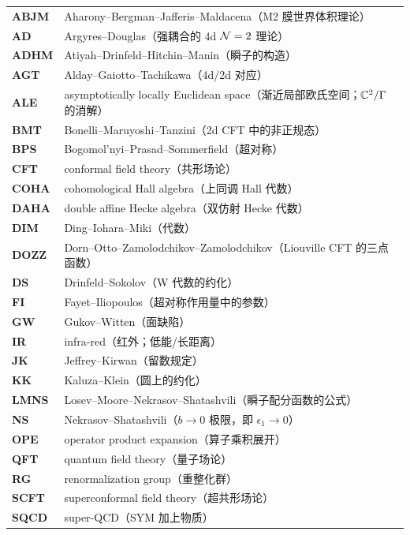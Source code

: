 {\small
\begin{longtable}{@{}l@{\hspace{1.2em}}p{13.1cm}@{}}
\textbf{ABJM} & Aharony--Bergman--Jafferis--Maldacena（M2 膜世界体积理论）\\
\textbf{AD} & Argyres--Douglas（强耦合的 4d $\mathcal{N}=2$ 理论）\\
\textbf{ADHM} & Atiyah--Drinfeld--Hitchin--Manin（瞬子的构造）\\
\textbf{AGT} & Alday--Gaiotto--Tachikawa（4d/2d 对应）\\
\textbf{ALE} & asymptotically locally Euclidean space（渐近局部欧氏空间；$\mathbb{C}^2/\Gamma$ 的消解）\\
\textbf{BMT} & Bonelli--Maruyoshi--Tanzini（2d CFT 中的非正规态）\\
\textbf{BPS} & Bogomol'nyi--Prasad--Sommerfield（超对称）\\
\textbf{CFT} & conformal field theory（共形场论）\\
\textbf{COHA} & cohomological Hall algebra（上同调 Hall 代数）\\
\textbf{DAHA} & double affine Hecke algebra（双仿射 Hecke 代数）\\
\textbf{DIM} & Ding--Iohara--Miki（代数）\\
\textbf{DOZZ} & Dorn--Otto--Zamolodchikov--Zamolodchikov（Liouville CFT 的三点函数）\\
\textbf{DS} & Drinfeld--Sokolov（W 代数的约化）\\
\textbf{FI} & Fayet--Iliopoulos（超对称作用量中的参数）\\
\textbf{GW} & Gukov--Witten（面缺陷）\\
\textbf{IR} & infra-red（红外；低能/长距离）\\
\textbf{JK} & Jeffrey--Kirwan（留数规定）\\
\textbf{KK} & Kaluza--Klein（圆上的约化）\\
\textbf{LMNS} & Losev--Moore--Nekrasov--Shatashvili（瞬子配分函数的公式）\\
\textbf{NS} & Nekrasov--Shatashvili（$b\to0$ 极限，即 $\epsilon_1\to0$）\\
\textbf{OPE} & operator product expansion（算子乘积展开）\\
\textbf{QFT} & quantum field theory（量子场论）\\
\textbf{RG} & renormalization group（重整化群）\\
\textbf{SCFT} & superconformal field theory（超共形场论）\\
\textbf{SQCD} & super-QCD（SYM 加上物质）\\

\end{longtable}}
